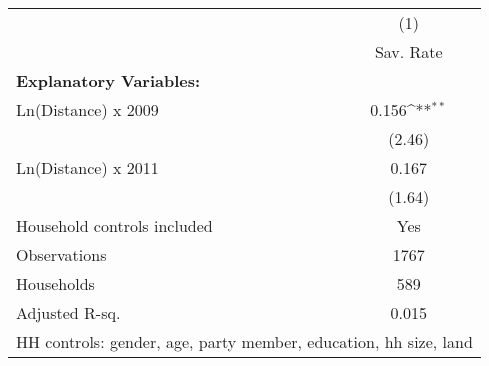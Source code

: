{
\def\sym#1{\ifmmode^{#1}\else\(^{#1}\)\fi}
\begin{tabular}{l*{1}{c}}
\hline\hline
                    &\multicolumn{1}{c}{(1)}\\
                    &\multicolumn{1}{c}{Sav. Rate}\\
\hline
\textbf{Explanatory Variables:}&                    \\
[1em]
Ln(Distance) x 2009 &       0.156\sym{**}\\
                    &      (2.46)        \\
[1em]
Ln(Distance) x 2011 &       0.167        \\
                    &      (1.64)        \\
[1em]
Household controls included &         Yes        \\
\hline
Observations        &        1767        \\
Households          &         589        \\
Adjusted R-sq.      &       0.015        \\
\hline\hline
\multicolumn{2}{l}{\footnotesize HH controls: gender, age, party member, education, hh size, land}\\
\end{tabular}
}
